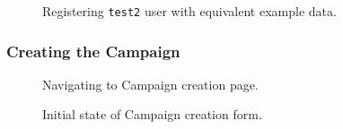 \documentclass{article}
\begin{document}
		\begin{figure}[H]
			\centering
			\caption{Registering \texttt{test2} user with equivalent example data.}
			\label{fig:eval-prep-4}
		\end{figure}

		\FloatBarrier
		\subsubsection{Creating the Campaign}

		\begin{figure}[H]
			\centering
			\caption{Navigating to Campaign creation page.}
			\label{fig:eval-ca-1}
		\end{figure}

		\begin{figure}[H]
			\centering
			\caption{Initial state of Campaign creation form.}
			\label{fig:eval-ca-2}
		\end{figure}
\end{document}
